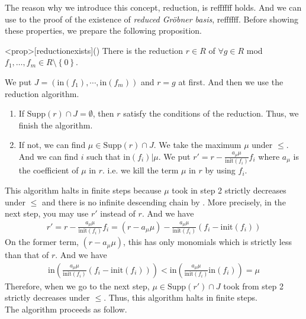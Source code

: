 \documentclass{article}
\begin{document}
The reason why we introduce this concept, reduction, is reffffff holds. And we can use to the proof of the existence of \textit{reduced Gr\"{o}bner basis}, reffffff. Before showing these properties, we prepare the following proposition.

\begin{statementsp}<prop>[reductionexists]()
    There is the reduction $r \in R$ of $\forall g \in R$ mod $f_1, \ldots, f_m \in R \setminus \left\{ 0 \right\}$.
\end{statementsp}
\begin{pfsp}
    We put $J = \left( \mathrm{in}(f_1), \cdots, \mathrm{in}(f_m) \right)$ and $r = g$ at first. And then we use the reduction algorithm.
    \begin{enumerate}
        \item If $\mathrm{Supp}(r) \cap J = \emptyset$, then $r$ satisfy the conditions of the reduction. Thus, we finish the algorithm.
        \item If not, we can find $\mu \in \mathrm{Supp}(r) \cap J$. We take the maximum $\mu$ under $\leq$. And we can find $i$ such that $\mathrm{in}(f_i) \vert \mu$. We put $\displaystyle{r' = r - \frac{a_{\mu} \mu}{\mathrm{init}(f_i)} f_i}$ where $a_{\mu}$ is the coefficient of $\mu$ in $r$. i.e. we kill the term $\mu$ in $r$ by using $f_i$. 
    \end{enumerate}
    This algorithm halts in finite steps because $\mu$ took in step 2 strictly decreases under $\leq$ and there is no infinite descending chain by . More precisely, in the next step, you may use $r'$ instead of $r$. And we have
    \begin{align}
        r' = r - \frac{a_{\mu} \mu}{\mathrm{init}(f_i)} f_i = (r - a_{\mu} \mu) - \frac{a_{\mu} \mu}{\mathrm{init}(f_i)} \left( f_i - \mathrm{init}(f_i) \right)
    \end{align}
    On the former term, $(r-a_{\mu} \mu)$, this has only monomials which is strictly less than that of $r$. And we have
    \begin{align}
        \mathrm{in} \left( \frac{a_{\mu} \mu}{\mathrm{init}(f_i)} \left( f_i - \mathrm{init}(f_i) \right) \right) < \mathrm{in} \left( \frac{a_{\mu} \mu}{\mathrm{init}(f_i)} \mathrm{in}(f_i) \right) = \mu
    \end{align}
    Therefore, when we go to the next step, $\mu \in \mathrm{Supp}(r') \cap J$ took from step 2 strictly decreases under $\leq$. Thus, this algorithm halts in finite steps.\\ 
    The algorithm proceeds as follow. 

\end{pfsp}
\end{document}
